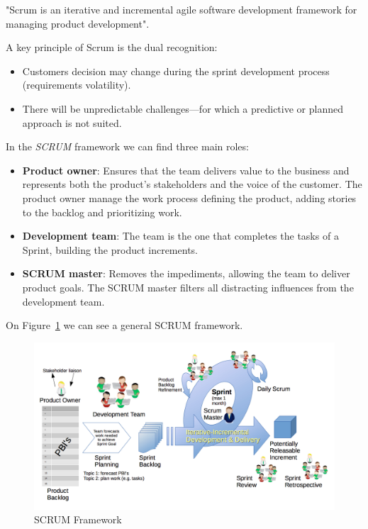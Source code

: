 \documentclass[a4paper, 12pt, english]{book}
\begin{document}
"Scrum is an iterative and incremental agile software development framework for managing product development".

A key principle of Scrum is the dual recognition:
\begin{itemize}
    \item Customers decision may change during the sprint development process (requirements volatility).
    \item There will be unpredictable challenges—for which a predictive or planned approach is not suited.
\end{itemize}

In the \textit{SCRUM} framework we can find three main roles:
\begin{itemize}
    \item \textbf{Product owner}: Ensures that the team delivers value to the business and represents both the product's stakeholders and the voice of the customer. The product owner manage the work process defining the product, adding stories to the backlog and prioritizing work.
    \item \textbf{Development team}: The team is the one that completes the tasks of a Sprint, building the product increments.
    \item \textbf{SCRUM master}: Removes the impediments, allowing the team to deliver product goals. The SCRUM master  filters all distracting influences from the development team.
\end{itemize}

On Figure~\ref{fig:scrum-framework} we can see a general SCRUM framework.
\begin{figure}
  \centering
  \includegraphics[width=14cm, keepaspectratio]{img/Scrum_Framework}
  \caption{SCRUM Framework}
  \label{fig:scrum-framework}
\end{figure}
\end{document}
